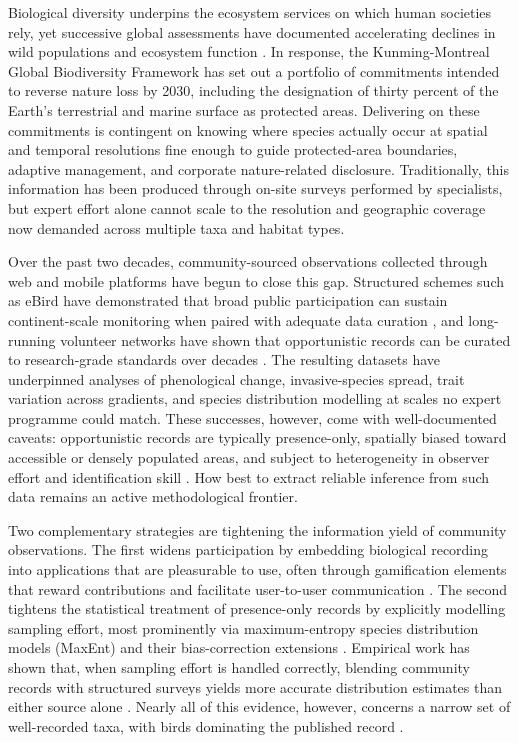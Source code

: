 \documentclass[11pt]{article}
\begin{document}
Biological diversity underpins the ecosystem services on which human societies rely, yet successive global assessments have documented accelerating declines in wild populations and ecosystem function \citep{ipbes2019global,newbold2015land}. In response, the Kunming-Montreal Global Biodiversity Framework has set out a portfolio of commitments intended to reverse nature loss by 2030, including the designation of thirty percent of the Earth's terrestrial and marine surface as protected areas. Delivering on these commitments is contingent on knowing where species actually occur at spatial and temporal resolutions fine enough to guide protected-area boundaries, adaptive management, and corporate nature-related disclosure. Traditionally, this information has been produced through on-site surveys performed by specialists, but expert effort alone cannot scale to the resolution and geographic coverage now demanded across multiple taxa and habitat types.

Over the past two decades, community-sourced observations collected through web and mobile platforms have begun to close this gap. Structured schemes such as eBird have demonstrated that broad public participation can sustain continent-scale monitoring when paired with adequate data curation \citep{sullivan2009ebird,bonney2009citizen,chandler2017contribution}, and long-running volunteer networks have shown that opportunistic records can be curated to research-grade standards over decades \citep{pocock2015brc}. The resulting datasets have underpinned analyses of phenological change, invasive-species spread, trait variation across gradients, and species distribution modelling at scales no expert programme could match. These successes, however, come with well-documented caveats: opportunistic records are typically presence-only, spatially biased toward accessible or densely populated areas, and subject to heterogeneity in observer effort and identification skill \citep{isaac2014statistics,feldman2021trends,kendal2020citybias}. How best to extract reliable inference from such data remains an active methodological frontier.

Two complementary strategies are tightening the information yield of community observations. The first widens participation by embedding biological recording into applications that are pleasurable to use, often through gamification elements that reward contributions and facilitate user-to-user communication \citep{bonney2009citizen,chandler2017contribution}. The second tightens the statistical treatment of presence-only records by explicitly modelling sampling effort, most prominently via maximum-entropy species distribution models (MaxEnt) and their bias-correction extensions \citep{phillips2006maxent,phillips2008maxentextensions,phillips2009samplebias,elith2011statistical}. Empirical work has shown that, when sampling effort is handled correctly, blending community records with structured surveys yields more accurate distribution estimates than either source alone \citep{johnston2018estimates,johnston2021analytical,robinson2020integrating,steen2019stringent,milanesi2020observer}. Nearly all of this evidence, however, concerns a narrow set of well-recorded taxa, with birds dominating the published record \citep{feldman2021trends}.
\end{document}
